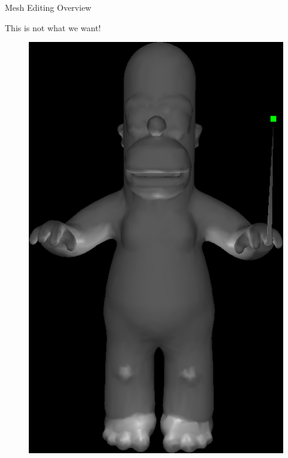 \documentclass{beamer}
\begin{document}
\begin{frame}{Mesh Editing Overview}

This is not what we want!

\begin{figure}
\begin{minipage}{0.4\textwidth}
    \includegraphics[width=\textwidth]{HomerPointDrag.png}
\end{minipage}
\begin{minipage}{0.4\textwidth}

\end{minipage}
\end{figure}
\end{frame}
\end{document}
